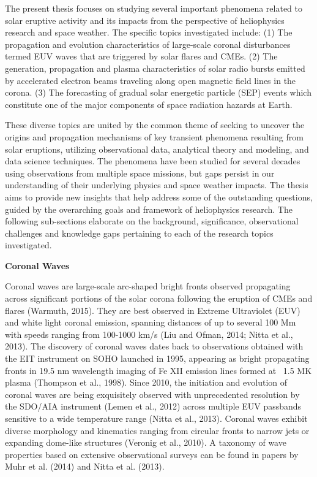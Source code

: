 \documentclass{article}
\begin{document}
The present thesis focuses on studying several important phenomena related to solar eruptive activity and its impacts from the perspective of heliophysics research and space weather. The specific topics investigated include: (1) The propagation and evolution characteristics of large-scale coronal disturbances termed EUV waves that are triggered by solar flares and CMEs. (2) The generation, propagation and plasma characteristics of solar radio bursts emitted by accelerated electron beams traveling along open magnetic field lines in the corona. (3) The forecasting of gradual solar energetic particle (SEP) events which constitute one of the major components of space radiation hazards at Earth.

These diverse topics are united by the common theme of seeking to uncover the origins and propagation mechanisms of key transient phenomena resulting from solar eruptions, utilizing observational data, analytical theory and modeling, and data science techniques. The phenomena have been studied for several decades using observations from multiple space missions, but gaps persist in our understanding of their underlying physics and space weather impacts. The thesis aims to provide new insights that help address some of the outstanding questions, guided by the overarching goals and framework of heliophysics research. The following sub-sections elaborate on the background, significance, observational challenges and knowledge gaps pertaining to each of the research topics investigated.


\textbf{Coronal Waves}

Coronal waves are large-scale arc-shaped bright fronts observed propagating across significant portions of the solar corona following the eruption of CMEs and flares (Warmuth, 2015). They are best observed in Extreme Ultraviolet (EUV) and white light coronal emission, spanning distances of up to several 100 Mm with speeds ranging from 100-1000 km/s (Liu and Ofman, 2014; Nitta et al., 2013). The discovery of coronal waves dates back to observations obtained with the EIT instrument on SOHO launched in 1995, appearing as bright propagating fronts in 19.5 nm wavelength imaging of Fe XII emission lines formed at ~1.5 MK plasma (Thompson et al., 1998). Since 2010, the initiation and evolution of coronal waves are being exquisitely observed with unprecedented resolution by the SDO/AIA instrument (Lemen et al., 2012) across multiple EUV passbands sensitive to a wide temperature range (Nitta et al., 2013). Coronal waves exhibit diverse morphology and kinematics ranging from circular fronts to narrow jets or expanding dome-like structures (Veronig et al., 2010). A taxonomy of wave properties based on extensive observational surveys can be found in papers by Muhr et al. (2014) and Nitta et al. (2013).
\end{document}
